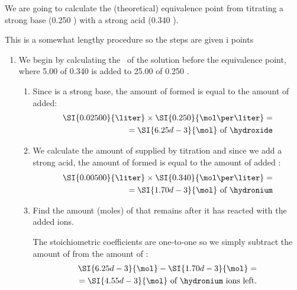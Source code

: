 \documentclass[../mit-general-chemistry.tex]{subfiles}
\begin{document}
\begin{example}
  We are going to calculate the (theoretical) equivalence point from
  titrating a strong base (\SI{0.250}{\molar} ) with a strong
  acid (\SI{0.340}{\molar} ).

  \paragraphbreak

  This is a somewhat lengthy procedure so the steps are given i points

  \begin{enumerate}[label=\arabic*)]
  \item We begin by calculating the \pH\ of the solution before the
    equivalence point, where \SI{5.00}{\milliliter} of
    \SI{0.340}{\molar}  is added to \SI{25.00}{\milliliter}
    of \SI{0.250}{\molar} .

    \begin{enumerate}[label=\alph*)]
    \item Since  is a strong base, the amount of formed \hydroxide is
      equal to the amount of  added:
      \begin{equation*}
        \begin{split}
          \SI{0.02500}{\liter}\times\SI{0.250}{\mol\per\liter}
          =\\= \SI{6.25d-3}{\mol}~\text{of \hydroxide}
        \end{split}
      \end{equation*}

    \item We calculate the amount of \hydronium supplied by titration and
      since we add a strong acid, the amount of formed \hydronium is equal
      to the amount of added :
      \begin{equation*}
        \begin{split}
          \SI{0.00500}{\liter}\times\SI{0.340}{\mol\per\liter}
          =\\= \SI{1.70d-3}{\mol}~\text{of \hydronium}
        \end{split}
      \end{equation*}
      
    \item Find the amount (moles) of \hydroxide that remains after it
      has reacted with the added \hydronium ions.

      The stoichiometric coefficients are one-to-one so we simply subtract
      the amount of \hydronium from the amount of \hydroxide:
      \begin{equation*}
        \begin{split}
          \SI{6.25d-3}{\mol} - \SI{1.70d-3}{\mol} =\\=
          \SI{4.55d-3}{\mol}~\text{of \hydronium ions left.}
        \end{split}
      \end{equation*}
      

\end{enumerate}
\end{enumerate}
\end{example}
\end{document}
